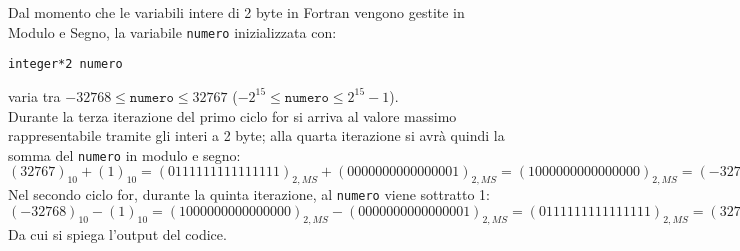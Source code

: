 Dal momento che le variabili intere di 2 byte in Fortran vengono gestite in Modulo e Segno, la variabile \texttt{numero} inizializzata con:
\begin{verbatim}
integer*2 numero
\end{verbatim}
varia tra \( -32768 \leq \texttt{numero} \leq 32767 \) (\( - 2^{15} \leq \texttt{numero} \leq 2^{15} - 1 \)). \\ 
Durante la terza iterazione del primo ciclo for si arriva al valore massimo rappresentabile tramite gli interi a 2 byte; alla quarta iterazione si avrà quindi la somma del \texttt{numero} in modulo e segno:
\[
(32767)_{10}+(1)_{10} = (0111111111111111)_{2,MS} + (0000000000000001)_{2,MS} = (1000000000000000)_{2,MS} = (-32768)_{10} 
\]
Nel secondo ciclo for, durante la quinta iterazione, al \texttt{numero} viene sottratto 1:
\[
(-32768)_{10}-(1)_{10} = (1000000000000000)_{2,MS} - (0000000000000001)_{2,MS} = (0111111111111111)_{2,MS} = (32767)_{10} 
\]
Da cui si spiega l'output del codice.